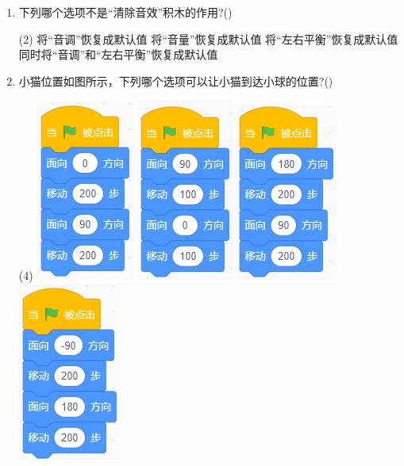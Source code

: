 \documentclass[10pt, a4paper]{article}
\begin{document}
\begin{enumerate}
        \item 下列哪个选项不是“清除音效”积木的作用?(\qquad)
        \begin{tasks}(2)
            \task 将“音调”恢复成默认值
            \task 将“音量”恢复成默认值
            \task 将“左右平衡”恢复成默认值
            \task 同时将“音调”和“左右平衡”恢复成默认值
        \end{tasks}

        \newpage
        \item 小猫位置如图所示，下列哪个选项可以让小猫到达小球的位置?(\qquad)
        \begin{tasks}(4)
            \task \includegraphics[width=.11\textwidth]{21a.png}
            \task \includegraphics[width=.11\textwidth]{21b.png}
            \task \includegraphics[width=.12\textwidth]{21c.png}
            \task \includegraphics[width=.12\textwidth]{21d.png}
        \end{tasks}


\end{enumerate}
\end{document}

